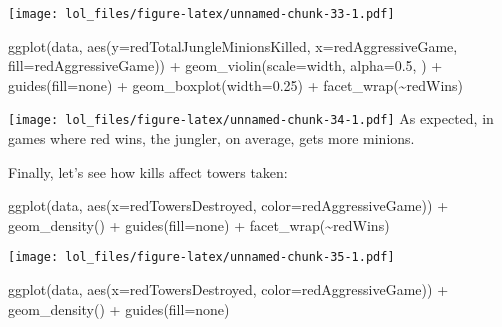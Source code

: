 \documentclass[
]{article}
\newenvironment{Shaded}{\begin{snugshade}}{\end{snugshade}}
\newcommand{\AttributeTok}[1]{\textcolor[rgb]{0.77,0.63,0.00}{#1}}
\newcommand{\FloatTok}[1]{\textcolor[rgb]{0.00,0.00,0.81}{#1}}
\newcommand{\FunctionTok}[1]{\textcolor[rgb]{0.00,0.00,0.00}{#1}}
\newcommand{\NormalTok}[1]{#1}
\newcommand{\SpecialCharTok}[1]{\textcolor[rgb]{0.00,0.00,0.00}{#1}}
\newcommand{\StringTok}[1]{\textcolor[rgb]{0.31,0.60,0.02}{#1}}
\begin{document}
\texttt{[image: lol\_files/figure-latex/unnamed-chunk-33-1.pdf]}

\begin{Shaded}
\begin{Highlighting}[]
\FunctionTok{ggplot}\NormalTok{(data, }\FunctionTok{aes}\NormalTok{(}\AttributeTok{y=}\NormalTok{redTotalJungleMinionsKilled, }\AttributeTok{x=}\NormalTok{redAggressiveGame, }\AttributeTok{fill=}\NormalTok{redAggressiveGame)) }\SpecialCharTok{+} 
  \FunctionTok{geom\_violin}\NormalTok{(}\AttributeTok{scale=}\StringTok{\textquotesingle{}width\textquotesingle{}}\NormalTok{, }\AttributeTok{alpha=}\FloatTok{0.5}\NormalTok{, ) }\SpecialCharTok{+}
  \FunctionTok{guides}\NormalTok{(}\AttributeTok{fill=}\StringTok{\textquotesingle{}none\textquotesingle{}}\NormalTok{) }\SpecialCharTok{+} 
  \FunctionTok{geom\_boxplot}\NormalTok{(}\AttributeTok{width=}\FloatTok{0.25}\NormalTok{) }\SpecialCharTok{+}
  \FunctionTok{facet\_wrap}\NormalTok{(}\SpecialCharTok{\textasciitilde{}}\NormalTok{redWins)}
\end{Highlighting}
\end{Shaded}

\texttt{[image: lol\_files/figure-latex/unnamed-chunk-34-1.pdf]} As
expected, in games where red wins, the jungler, on average, gets more
minions.

Finally, let's see how kills affect towers taken:

\begin{Shaded}
\begin{Highlighting}[]
\FunctionTok{ggplot}\NormalTok{(data, }\FunctionTok{aes}\NormalTok{(}\AttributeTok{x=}\NormalTok{redTowersDestroyed, }\AttributeTok{color=}\NormalTok{redAggressiveGame)) }\SpecialCharTok{+} 
  \FunctionTok{geom\_density}\NormalTok{()  }\SpecialCharTok{+}
  \FunctionTok{guides}\NormalTok{(}\AttributeTok{fill=}\StringTok{\textquotesingle{}none\textquotesingle{}}\NormalTok{) }\SpecialCharTok{+} 
  \FunctionTok{facet\_wrap}\NormalTok{(}\SpecialCharTok{\textasciitilde{}}\NormalTok{redWins)}
\end{Highlighting}
\end{Shaded}

\texttt{[image: lol\_files/figure-latex/unnamed-chunk-35-1.pdf]}

\begin{Shaded}
\begin{Highlighting}[]
\FunctionTok{ggplot}\NormalTok{(data, }\FunctionTok{aes}\NormalTok{(}\AttributeTok{x=}\NormalTok{redTowersDestroyed, }\AttributeTok{color=}\NormalTok{redAggressiveGame)) }\SpecialCharTok{+} 
  \FunctionTok{geom\_density}\NormalTok{()  }\SpecialCharTok{+}
  \FunctionTok{guides}\NormalTok{(}\AttributeTok{fill=}\StringTok{\textquotesingle{}none\textquotesingle{}}\NormalTok{)}
\end{Highlighting}
\end{Shaded}
\end{document}
